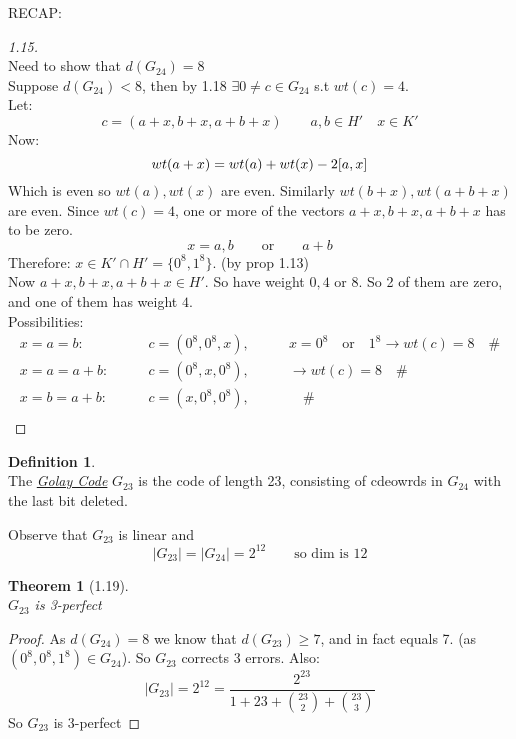\documentclass[]{article}
\newtheorem{thm}{Theorem}[section]
\theoremstyle{definition}
\newtheorem*{defn}{Definition}
\theoremstyle{remark}
\numberwithin{equation}{section}
\begin{document}
		RECAP:\\
		\begin{proof}[1.15]\hfill\\
		Need to show that $d(G_{24}) = 8$\\
		Suppose $d(G_{24}) < 8$, then by 1.18 $\exists 0 \neq c \in G_{24}$ s.t $wt(c) = 4$.\\
		Let:\\
		\[
			c = (a+x, b+x, a+b+x) \qquad a,b \in H' \quad x \in K'
		\]
		Now:\\
		\[
			wt(a+x) = wt(a) + wt(x) - 2[a,x]\\
		\]
		Which is even so $wt(a), wt(x)$ are even. Similarly $wt(b+x), wt(a+b+x)$ are even. Since $wt(c) = 4$, one or more of the vectors
		$a+x, b+x, a+b+x$ has to be zero.
		\[
			x = a,b \qquad \text{or} \qquad a+b
		\]
		Therefore: $x\in K' \cap H' = \{0^8, 1^8\}$.  (by prop 1.13)\\
		Now $a+x, b+x, a+b+x \in H'$. So have weight $0, 4$ or $8$. So 2 of them are zero, and one of them has weight $4$.\\
		Possibilities:\\
		\begin{align*}x = a = b: &\qquad c = (0^8, 0^8, x), &\qquad x= 0^8 \quad \text{or}\quad1^8 \rightarrow wt(c) = 8 \quad \#\\ %
			x = a = a + b: &\qquad c = (0^8, x, 0^8), &\qquad \rightarrow wt(c) = 8 \quad \#\\ %
			x = b = a + b: &\qquad c = (x, 0^8, 0^8), &\qquad  \quad \#\\ %
		\end{align*}
		\end{proof}

		\begin{defn} \hfill \\
			The \underline{\emph{Golay Code}} $G_{23}$ is the code of length 23, consisting of cdeowrds in $G_{24}$ with the last bit deleted.
		\end{defn}
		Observe that $G_{23}$ is linear and
		\[
			|G_{23}| = |G_{24}| = 2^{12}\qquad \text{so dim is $12$}
		\]
		\begin{thm}[1.19] \hfill \\
			$G_{23}$ is \emph{3-perfect}
		\end{thm}
		\begin{proof}
			As $d(G_{24}) = 8$ we know that $d(G_{23}) \geq 7$, and in fact equals 7. (as $(0^8, 0^8, 1^8) \in G_{24}$). So $G_{23}$ corrects 3 errors. Also:
			\[
				|G_{23}| = 2^{12} = \frac{2^{23}}{1+23+ \binom{23}{2} + \binom{23}{3}}
			\]
			So $G_{23}$ is 3-perfect
		\end{proof}
\end{document}
